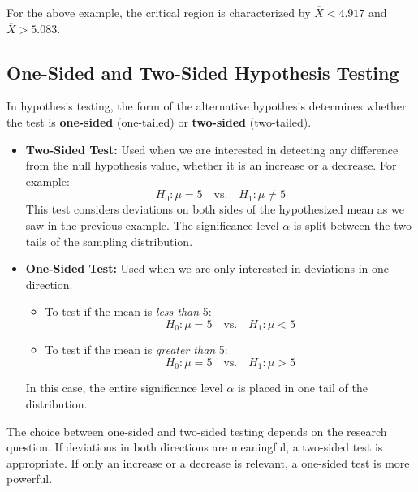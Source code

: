 \documentclass[twoside]{book}
\begin{document}
For the above example, the critical region is characterized by $\overline{X} < 4.917$ and $\overline{X} > 5.083$.

\subsection{One-Sided and Two-Sided Hypothesis Testing}

In hypothesis testing, the form of the alternative hypothesis determines whether the test is \textbf{one-sided} (one-tailed) or \textbf{two-sided} (two-tailed).

\begin{itemize}
    \item \textbf{Two-Sided Test:} Used when we are interested in detecting any difference from the null hypothesis value, whether it is an increase or a decrease. For example:
    \[
    H_0: \mu = 5 \quad \text{vs.} \quad H_1: \mu \ne 5
    \]
    This test considers deviations on both sides of the hypothesized mean as we saw in the previous example. The significance level $\alpha$ is split between the two tails of the sampling distribution.

    \item \textbf{One-Sided Test:} Used when we are only interested in deviations in one direction.
    \begin{itemize}
        \item To test if the mean is \emph{less than} 5:
        \[
        H_0: \mu = 5 \quad \text{vs.} \quad H_1: \mu < 5
        \]
        \item To test if the mean is \emph{greater than} 5:
        \[
        H_0: \mu = 5 \quad \text{vs.} \quad H_1: \mu > 5
        \]
    \end{itemize}
    In this case, the entire significance level $\alpha$ is placed in one tail of the distribution.
\end{itemize}

\noindent
The choice between one-sided and two-sided testing depends on the research question. If deviations in both directions are meaningful, a two-sided test is appropriate. If only an increase or a decrease is relevant, a one-sided test is more powerful.



\end{document}
